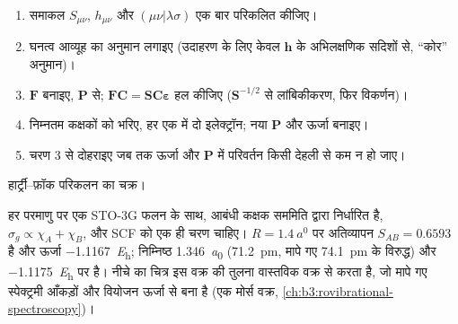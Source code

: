 \begin{method}[SCF प्रक्रिया]\label{met:b3:computational-chemistry:scf}
\begin{enumerate}
  \item समाकल $S_{\mu\nu}$, $h_{\mu\nu}$ और $(\mu\nu|\lambda\sigma)$ एक बार परिकलित कीजिए।
  \item घनत्व आव्यूह का अनुमान लगाइए (उदाहरण के लिए केवल
        $\mathbf h$ के अभिलक्षणिक सदिशों से, ``कोर'' अनुमान)।
  \item $\mathbf F$ बनाइए, $\mathbf P$ से; $\mathbf F\mathbf C = \mathbf S\mathbf C
        \boldsymbol\varepsilon$ हल कीजिए ($\mathbf S^{-1/2}$ से लांबिकीकरण, फिर विकर्णन)।
  \item निम्नतम कक्षकों को भरिए, हर एक में दो इलेक्ट्रॉन; नया $\mathbf P$
        और ऊर्जा बनाइए।
  \item चरण 3 से दोहराइए जब तक ऊर्जा और $\mathbf P$ में परिवर्तन किसी
        देहली से कम न हो जाए।
\end{enumerate}
\end{method}

\begin{omfigure}

{\small हार्ट्री--फ़ॉक परिकलन का  चक्र।}
\end{omfigure}

\begin{example}[न्यूनतम आधार में \ce{H2}]\label{ex:b3:computational-chemistry:h2}
हर परमाणु पर एक STO-3G फलन के साथ, आबंधी कक्षक सममिति द्वारा निर्धारित है,
$\sigma_g \propto \chi_A + \chi_B$, और SCF को एक ही चरण चाहिए। $R =
\qty{1.4}{\bohr}$ पर अतिव्यापन $S_{AB} = 0.6593$ है और ऊर्जा
\qty{-1.1167}{\hartree}; निम्निष्ठ \qty{1.346}{\bohr} (\qty{71.2}{pm},
मापे गए \qty{74.1}{pm} के विरुद्ध) और \qty{-1.1175}{\hartree} पर है। नीचे का चित्र
इस वक्र की तुलना वास्तविक वक्र से करता है, जो मापे गए स्पेक्ट्रमी
आँकड़ों और वियोजन ऊर्जा से बना है (एक मोर्स वक्र, \cref{ch:b3:rovibrational-spectroscopy})।
\end{example}

